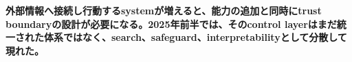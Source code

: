 \noindent\textbf{外部情報へ接続し行動するsystemが増えると、能力の追加と同時にtrust boundaryの設計が必要になる。2025年前半では、そのcontrol layerはまだ統一された体系ではなく、search、safeguard、interpretabilityとして分散して現れた。}\autocite{src-383476bdf62e,src-6e15bd50b7db,src-fdc10e3226e6}
